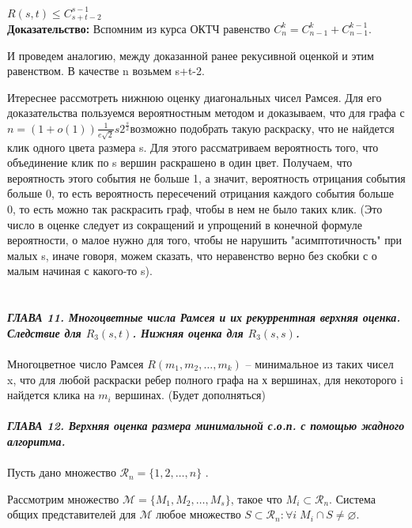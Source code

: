 \documentclass[12pt]{article}
\begin{document}
\(R(s, t) \leq C_{s+t-2}^{s-1}\)\\

\textbf{Доказательство:} Вспомним из курса ОКТЧ равенство \(C_{n}^k = C_{n-1}^{k} + C_{n-1}^{k-1}\). 

И проведем аналогию, между доказанной ранее рекусивной оценкой и этим равенством. В качестве n возьмем s+t-2. 

Итереснее рассмотреть нижнюю оценку диагональных чисел Рамсея. Для его доказательства пользуемся вероятностным методом и доказываем, что для графа с \(n = (1+o(1))\frac{1}{e\sqrt{2}}s2^{\frac{s}{2}}\)возможно подобрать такую раскраску, что не найдется клик одного цвета размера s. Для этого рассматриваем вероятность того, что объединение клик по s вершин раскрашено в один цвет. Получаем, что вероятность этого события не больше 1, а значит, вероятность отрицания события больше 0, то есть вероятность пересечений отрицания каждого события больше 0, то есть можно так раскрасить граф, чтобы в нем не было таких клик. (Это число в оценке следует из сокращений и упрощений в конечной формуле вероятности, о малое нужно для того, чтобы не нарушить "асимптотичность" при малых s, иначе говоря, можем сказать, что неравенство верно без скобки с о малым начиная с какого-то s).\\

\\
\newpage
\\
\textbf{\textit{ГЛАВА 11. Многоцветные числа Рамсея и их рекуррентная верхняя оценка. Следствие для \(R_{3}(s, t)\). Нижняя оценка для \(R_{3}(s, s)\).}}
\\
\\

Многоцветное число Рамсея \(R(m_1, m_2, \dots, m_k)\) -- минимальное из таких чисел x, что для любой раскраски ребер полного графа на х вершинах, для некоторого i найдется клика на \(m_i\) вершинах. 
(Будет дополняться)
\\
\newpage
\\
\textbf{\textit{ГЛАВА 12. Верхняя оценка размера минимальной с.о.п. с помощью жадного алгоритма.}}
\\
\\

Пусть дано множество \(\mathcal{R}_{n} = \{1, 2, \dots, n\}\) . 

Рассмотрим множество \(\mathcal{M} = \{M_1, M_2, \dots, M_s\}\), такое что \(M_i \subset \mathcal{R}_{n}\).  Система общих представителей для \(\mathcal{M}\)  любое множество \(S \subset \mathcal{R}_n: \forall i     \;M_i \cap S \neq \varnothing\).
\end{document}
